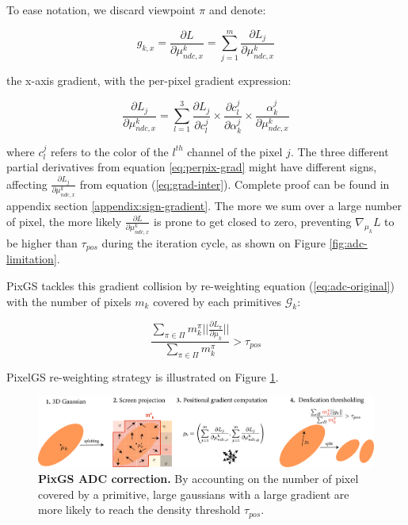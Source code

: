 To ease notation, we discard viewpoint $\pi$ and denote: 

\begin{equation}
\label{eq:grad-inter}
    g_{k,x} = \frac{\partial L}{\partial \mu^{k}_{ndc,x}} = \sum \limits_{j=1}^{m} \frac{\partial L_{j}}{\partial \mu^{k}_{ndc,x}} 
\end{equation}

the x-axis gradient, with the per-pixel gradient expression: 

\begin{equation}
\label{eq:perpix-grad}
\frac{\partial L_{j}}{\partial \mu^{k}_{ndc,x}} = \sum \limits_{l=1}^{3} \frac{\partial L_{j}}{\partial c_{l}^{j}}\times \frac{\partial c_{l}^{j}}{\partial \alpha_{k}^{j}} \times \frac{\alpha_{k}^{j}}{\partial \mu^{k}_{ndc,x} }
\end{equation}

where $c_{l}^{j}$ refers to the color of the $l^{th}$ channel of the pixel $j$. The three different partial derivatives from equation \eqref{eq:perpix-grad} might have different signs, affecting $\frac{\partial L_{j}}{\partial \mu^{k}_{ndc,x}}$ from equation (\ref{eq:grad-inter}). Complete proof can be found in appendix section \ref{appendix:sign-gradient}. The more we sum over a large number of pixel, the more likely $\frac{\partial L}{\partial \mu^{k}_{ndc,x}}$ is prone to get closed to zero, preventing $\nabla_{\mu_{k}}L$ to be higher than $\tau_{pos}$ during the iteration cycle, as shown on Figure \ref{fig:adc-limitation}. 

PixGS tackles this gradient collision by re-weighting equation (\ref{eq:adc-original}) with the number of pixels $m_{k}$ covered by each primitives $\mathcal{G}_{k}$: 

\begin{equation}
\frac{\sum \limits_{\pi \in \Pi} m_{k}^{\pi} ||\frac{\partial L_{\pi}}{\partial \mu_{k}}||}{\sum \limits_{\pi \in \Pi}m_{k}^{\pi}} > \tau_{pos}
\label{eq:adc-pixgs}
\end{equation}

PixelGS re-weighting strategy is illustrated on Figure \ref{fig:pixgs-adc}. 


\begin{figure}[htbp!]
    \center
  \includegraphics[width=\linewidth]{images/gaussiansplatting/pixgs_implem_improvement.png}
  \caption{\textbf{PixGS ADC correction.} By accounting on the number of pixel covered by a primitive, large gaussians with a large gradient are more likely to reach the density threshold $\tau_{pos}$.}
  \label{fig:pixgs-adc}
\end{figure}


